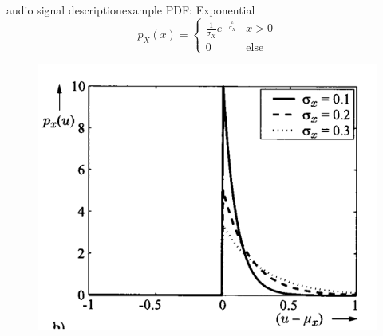 \begin{frame}{audio signal description}{example PDF: Exponential}
    \vspace{-5mm}
	\begin{equation*}
		p_X(x)= \left\lbrace  \begin{array}{ll}
		  \frac{1}{\sigma_X}e^{-\frac{x}{\sigma_X}} & x >0 \\
		  0 & \textrm{else} 
	\end{array}\right.
	\end{equation*}
    \begin{figure}
		\centering
			\includegraphics[scale=.5]{graph/expdist}
	\end{figure}
\end{frame}	
	

